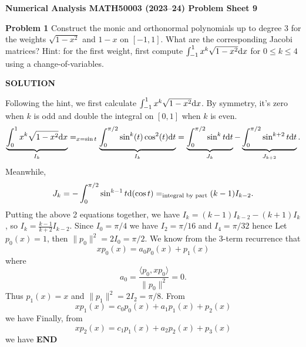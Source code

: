 \documentclass[12pt,a4paper]{article}
\def\endash{–}
\begin{document}
\textbf{Numerical Analysis MATH50003 (2023\ensuremath{\endash}24) Problem Sheet 9}

\textbf{Problem 1} Construct the monic and orthonormal polynomials up to degree $3$ for the weights $\sqrt{1-x^2}$ and $1-x$ on $[-1,1]$. What are the corresponding Jacobi matrices? Hint: for the first weight, first compute $\int_{-1}^1 x^k \sqrt{1-x^2} {\rm d} x$ for $0 \ensuremath{\leq} k \ensuremath{\leq} 4$ using a change-of-variables.

\textbf{SOLUTION}

Following the hint, we first calculate $\int_{-1}^1 x^k\sqrt{1-x^2}{\rm d}x$. By symmetry, it's zero when $k$ is odd and double the integral on $[0,1]$ when $k$ is even.
\[
\underbrace{\int_0^1 x^k\sqrt{1-x^2}{\rm d}x}_{I_k} = _{x=\sin t}\underbrace{\int_0^{\ensuremath{\pi}/2}\sin^k(t)\cos^2(t){\rm d}t}_{I_k}=\underbrace{\int_0^{\ensuremath{\pi}/2}\sin^k t{\rm d}t}_{J_k}-\underbrace{\int_0^{\ensuremath{\pi}/2}\sin^{k+2}t{\rm d}t}_{J_{k+2}}.
\]
Meanwhile,
\[
J_k=-\int_0^{\ensuremath{\pi}/2}\sin^{k-1}t{\rm d}(\cos t)=_{\text{integral by part}}(k-1)I_{k-2}.
\]
Putting the above 2 equations together, we have $I_k=(k-1)I_{k-2}-(k+1)I_k$, so $I_k=\frac{k-1}{k+2}I_{k-2}$. Since $I_0=\ensuremath{\pi}/4$ we have $I_2 = {\ensuremath{\pi} / 16}$ and $I_4 = \ensuremath{\pi}/32$ hence
Let $p_0(x)=1$, then $\|p_0\|^2=2I_0=\ensuremath{\pi}/2$. We know from the 3-term recurrence that
\[
xp_0(x)=a_0p_0(x)+p_1(x)
\]
where
\[
a_0=\frac{\ensuremath{\langle} p_0,xp_0\ensuremath{\rangle}}{\|p_0\|^2}=0.
\]
Thus $p_1(x)=x$ and $\|p_1\|^2=2I_2=\ensuremath{\pi}/8$. From
\[
xp_1(x)=c_0p_0(x)+a_1p_1(x)+p_2(x)
\]
we have
Finally, from
\[
xp_2(x)=c_1p_1(x)+a_2p_2(x)+p_3(x)
\]
we have
\textbf{END}
\end{document}
